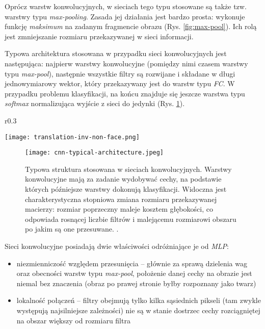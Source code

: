 Oprócz warstw konwolucyjnych, w sieciach tego typu stosowane są także tzw. warstwy typu \textit{max-pooling}. Zasada jej działania jest bardzo prosta: wykonuje funkcję \textit{maksimum} na zadanym fragmencie obrazu (Rys. \ref{fig:max-pool}). Ich rolą jest zmniejszanie rozmiaru przekazywanej w sieci informacji.

Typowa architektura stosowana w przypadku sieci konwolucyjnych jest następująca: najpierw warstwy konwolucyjne (pomiędzy nimi czasem warstwy typu \textit{max-pool}), następnie wszystkie filtry są rozwijane i składane w długi jednowymiarowy wektor, który przekazywany jest do warstw typu \textit{FC}. W przypadku problemu klasyfikacji, na końcu znajduje się jeszcze warstwa typu \textit{softmax} normalizująca wyjście z sieci do jedynki (Rys. \ref{fig:cnn-arch}). 

\begin{wrapfigure}[10]{r}{0.3\textwidth}
  \begin{center}
  	\vspace{-1em}
	\texttt{[image: translation-inv-non-face.png]}
	\caption{.}
   	\label{fig:translation-inv-nonface}
  \end{center}
\end{wrapfigure}


\begin{figure}[ht]
	\centering
	\texttt{[image: cnn-typical-architecture.jpeg]}
	\caption{Typowa struktura stosowana w sieciach konwolucyjnych. Warstwy konwolucyjne mają za zadanie wydobywać cechy, na podstawie których późniejsze warstwy dokonują klasyfikacji.
	Widoczna jest charakterystyczna stopniowa zmiana rozmiaru przekazywanej macierzy: rozmiar poprzeczny maleje kosztem głębokości, co odpowiada rosnącej liczbie filtrów i malejącemu rozmiarowi obszaru po jakim są one przesuwane. .}
	\label{fig:cnn-arch}
\end{figure}



Sieci konwolucyjne posiadają dwie właściwości odróżniające je od \textit{MLP}:
\begin{itemize}
	\item niezmienniczość względem przesunięcia  -- głównie za sprawą dzielenia wag oraz obecności warstw typu \textit{max-pool}, położenie danej cechy na obrazie jest niemal bez znaczenia (obraz po prawej stronie byłby rozpoznany jako twarz)
	\item lokalność połączeń -- filtry obejmują tylko kilka sąsiednich pikseli (tam zwykle występują najsilniejsze zależności) nie są w stanie dostrzec cechy rozciągniętej na obszar większy od rozmiaru filtra
\end{itemize}

